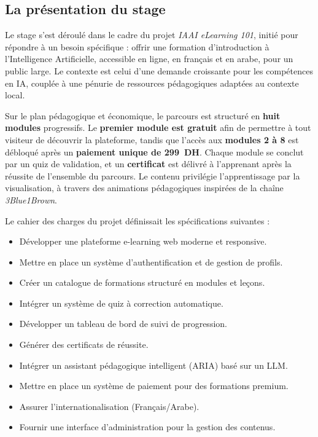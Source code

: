 \documentclass[12pt, a4paper]{report}
\begin{document}
\subsection{La présentation du stage}
Le stage s'est déroulé dans le cadre du projet \textit{IAAI eLearning 101},
initié pour répondre à un besoin spécifique : offrir une formation d'introduction
à l'Intelligence Artificielle, accessible en ligne, en français et en arabe, pour
un public large. Le contexte est celui d'une demande croissante pour les
compétences en IA, couplée à une pénurie de ressources pédagogiques adaptées au
contexte local.

Sur le plan pédagogique et économique, le parcours est structuré en
\textbf{huit modules} progressifs. Le \textbf{premier module est gratuit} afin
de permettre à tout visiteur de découvrir la plateforme, tandis que l'accès aux
\textbf{modules 2 à 8} est débloqué après un \textbf{paiement unique de 299~DH}.
Chaque module se conclut par un quiz de validation, et un \textbf{certificat}
est délivré à l'apprenant après la réussite de l'ensemble du parcours. Le
contenu privilégie l'apprentissage par la visualisation, à travers des
animations pédagogiques inspirées de la chaîne \textit{3Blue1Brown}.

Le cahier des charges du projet définissait les spécifications suivantes :
\begin{itemize}
    \item Développer une plateforme e-learning web moderne et responsive.
    \item Mettre en place un système d'authentification et de gestion de profils.
    \item Créer un catalogue de formations structuré en modules et leçons.
    \item Intégrer un système de quiz à correction automatique.
    \item Développer un tableau de bord de suivi de progression.
    \item Générer des certificats de réussite.
    \item Intégrer un assistant pédagogique intelligent (ARIA) basé sur un LLM.
    \item Mettre en place un système de paiement pour des formations premium.
    \item Assurer l'internationalisation (Français/Arabe).
    \item Fournir une interface d'administration pour la gestion des contenus.
\end{itemize}
\end{document}

